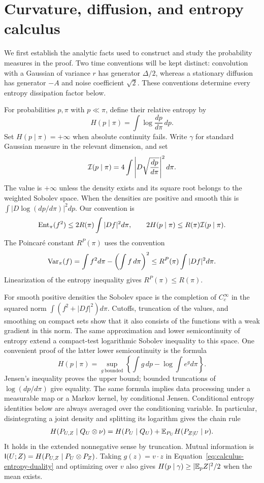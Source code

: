 \section{Curvature, diffusion, and entropy calculus}\label{sec:calculus}

We first establish the analytic facts used to construct and study the
probability measures in the proof. Two time conventions will be kept
distinct: convolution with a Gaussian of variance $r$ has generator
$\Delta/2$, whereas a stationary diffusion has generator $-A$ and noise
coefficient $\sqrt2$. These conventions determine every entropy
dissipation factor below.

For probabilities $p,\pi$ with $p\ll\pi$, define their relative entropy by
\[
 H(p\mid\pi)=\int\log\frac{dp}{d\pi}\,dp.
\]
Set $H(p\mid\pi)=+\infty$ when absolute continuity fails. Write
$\gamma$ for standard Gaussian measure in the relevant dimension, and set
\[
 \mathcal I(p\mid\pi)=4\int\left|D\sqrt{\frac{dp}{d\pi}}\right|^2d\pi.
\]
The value is $+\infty$ unless the density exists and its square root
belongs to the weighted Sobolev space. When the densities are positive
and smooth this is $\int|D\log(dp/d\pi)|^2dp$. Our convention is
\[
 \operatorname{Ent}_\pi(f^2)\le 2R(\pi)\int|Df|^2d\pi,
 \qquad 2H(p\mid\pi)\le R(\pi)\mathcal I(p\mid\pi).
\]
The Poincar\'e constant $R^P(\pi)$ uses the convention
\[
 \operatorname{Var}_\pi(f)=\int f^2d\pi-\left(\int f\,d\pi\right)^2
 \le R^P(\pi)\int|Df|^2d\pi.
\]
Linearization of the entropy inequality gives $R^P(\pi)\le R(\pi)$.

For smooth positive densities the Sobolev space is the completion of
$C_c^\infty$ in the squared norm $\int(f^2+|Df|^2)d\pi$.
Cutoffs, truncation of the values, and smoothing on compact sets show
that it also consists of the functions with a weak gradient in this
norm. The same approximation and lower semicontinuity of entropy
extend a compact-test logarithmic Sobolev inequality to this space.
One convenient proof of the latter lower semicontinuity is the formula
\begin{equation}\label{eq:calculus-entropy-duality}
 H(p\mid\pi)=\sup_{g\ \mathrm{bounded}}
 \left\{\int g\,dp-\log\int e^g d\pi\right\}.
\end{equation}
Jensen's inequality proves the upper bound; bounded truncations of
$\log(dp/d\pi)$ give equality. The same formula implies data
processing under a measurable map or a Markov kernel, by conditional
Jensen. Conditional entropy identities below are always averaged over
the conditioning variable. In particular, disintegrating a joint
density and splitting its logarithm gives the chain rule
\[
 H(P_{U,Z}\mid Q_U\otimes\nu)
 =H(P_U\mid Q_U)+\mathbb E_{P_U}H(P_{Z\mid U}\mid\nu).
\]
It holds in the extended nonnegative sense by truncation. Mutual
information is $\mathsf I(U;Z)=H(P_{U,Z}\mid P_U\otimes P_Z)$.
Taking $g(z)=v\cdot z$ in Equation~\eqref{eq:calculus-entropy-duality}
and optimizing over $v$ also gives
$H(p\mid\gamma)\ge|\mathbb E_pZ|^2/2$ when the mean exists.

